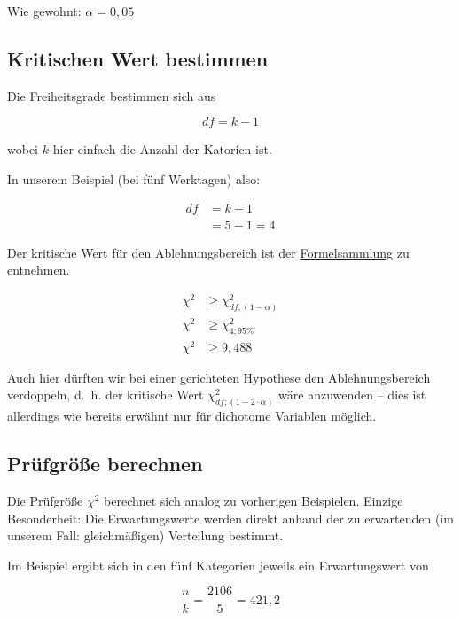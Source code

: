 \documentclass[
  11pt,
  ngerman,
  a4paper,
]{report}
\begin{document}
Wie gewohnt: \(\alpha=0{,}05\)

\hypertarget{kritischen-wert-bestimmen-1}{%
\subsection{Kritischen Wert bestimmen}\label{kritischen-wert-bestimmen-1}}

Die Freiheitsgrade bestimmen sich aus

\[
\mathit{df}=k-1
\label{eq:dfe}
\]

wobei \(k\) hier einfach die Anzahl der Katorien ist.

In unserem Beispiel (bei fünf Werktagen) also:

\[
\begin{aligned}
\mathit{df}&=k-1\\
&=5-1=4
\end{aligned}
\]

Der kritische Wert für den Ablehnungsbereich ist der \protect\hyperlink{formeln}{Formelsammlung} zu entnehmen.

\[
\begin{aligned}
\chi^2 &\geq \chi^2_{\mathit{df};(1-\alpha)}\\
\chi^2 &\geq \chi^2_{4;95\%}\\
\chi^2 &\geq 9{,}488
\end{aligned}
\]

Auch hier dürften wir bei einer gerichteten Hypothese den Ablehnungsbereich verdoppeln, d.~h. der kritische Wert \(\chi^2_{\mathit{df};(1-2\cdot \alpha)}\) wäre anzuwenden -- dies ist allerdings wie bereits erwähnt nur für dichotome Variablen möglich.

\hypertarget{pruxfcfgruxf6uxdfe-berechnen-5}{%
\subsection{Prüfgröße berechnen}\label{pruxfcfgruxf6uxdfe-berechnen-5}}

Die Prüfgröße \(\chi^2\) berechnet sich analog zu vorherigen Beispielen. Einzige Besonderheit: Die Erwartungswerte werden direkt anhand der zu erwartenden (im unserem Fall: gleichmäßigen) Verteilung bestimmt.

Im Beispiel ergibt sich in den fünf Kategorien jeweils ein Erwartungswert von

\[\frac{n}{k}=\frac{2106}{5}=421{,}2\]
\end{document}
